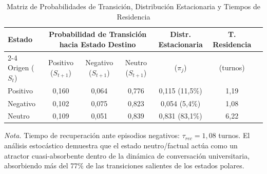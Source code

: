 \begin{table}[htbp]
  \centering
  \small
  \caption{Matriz de Probabilidades de Transición, Distribución Estacionaria y Tiempos de Residencia}
  \label{tab:transicion_markov}
  \label{tab:markov}
  \begin{tabular}{lcccccc}
    \toprule
    Estado & \multicolumn{3}{c}{Probabilidad de Transición hacia Estado Destino} & Distr. Estacionaria & T. Residencia \\
    \cmidrule(lr){2-4}
    Origen ($S_t$) & Positivo ($S_{t+1}$) & Negativo ($S_{t+1}$) & Neutro ($S_{t+1}$) & ($\pi_j$) & (turnos) \\
    \midrule
    Positivo & 0,160 & 0,064 & 0,776 & 0,115 (11,5\%) & 1,19 \\
    Negativo & 0,102 & 0,075 & 0,823 & 0,054 (5,4\%)  & 1,08 \\
    Neutro   & 0,109 & 0,051 & 0,839 & 0,831 (83,1\%) & 6,22 \\
    \bottomrule
  \end{tabular}
  \vspace{4pt}
  \begin{minipage}{0.94\textwidth}
    \footnotesize
    \textit{Nota.} Tiempo de recuperación ante episodios negativos: $\tau_{rec} = 1,08$ turnos. El análisis estocástico demuestra que el estado neutro/factual actúa como un atractor cuasi-absorbente dentro de la dinámica de conversación universitaria, absorbiendo más del 77\% de las transiciones salientes de los estados polares.
  \end{minipage}
\end{table}
